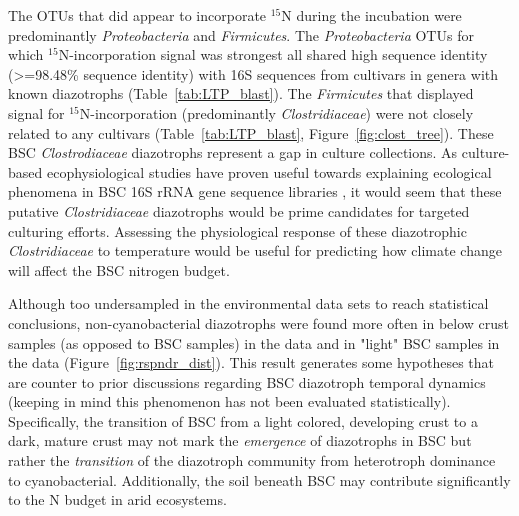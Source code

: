 The OTUs that did appear to incorporate $^{15}$N during the incubation were
predominantly \textit{Proteobacteria} and \textit{Firmicutes}. The
\textit{Proteobacteria} OTUs for which $^{15}$N-incorporation signal was
strongest all shared high sequence identity (\textgreater=98.48\% sequence
identity) with 16S sequences from cultivars in genera with known diazotrophs
(Table~\ref{tab:LTP_blast}). The \textit{Firmicutes} that displayed signal
for $^{15}$N-incorporation (predominantly \textit{Clostridiaceae}) were not
closely related to any cultivars (Table~\ref{tab:LTP_blast},
Figure~\ref{fig:clost_tree}). These BSC \textit{Clostrodiaceae} diazotrophs
represent a gap in culture collections. As culture-based ecophysiological
studies have proven useful towards explaining ecological phenomena in BSC 16S
rRNA gene sequence libraries \citep{Garcia_Pichel_2013}, it would seem that
these putative \textit{Clostridiaceae} diazotrophs would be prime candidates
for targeted culturing efforts. Assessing the physiological response of these
diazotrophic \textit{Clostridiaceae} to temperature would be useful for
predicting how climate change will affect the BSC nitrogen budget. 

Although too undersampled in the environmental data sets to reach statistical
conclusions, non-cyanobacterial diazotrophs were found more often in below
crust samples (as opposed to BSC samples) in the \citet{Steven_2013} data and
in "light" BSC samples in the \citet{Garcia_Pichel_2013} data
(Figure~\ref{fig:rspndr_dist}). This result generates some hypotheses that
are counter to prior discussions regarding BSC diazotroph temporal dynamics
(keeping in mind this phenomenon has not been evaluated statistically).
Specifically, the transition of BSC from a light colored, developing crust to
a dark, mature crust may not mark the \textit{emergence} of diazotrophs in
BSC but rather the \textit{transition} of the diazotroph community from
heterotroph dominance to cyanobacterial.  Additionally, the soil beneath BSC
may contribute significantly to the N budget in arid ecosystems.

